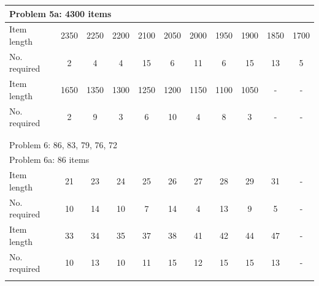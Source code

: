 \documentclass[a4paper]{article}
\begin{document}
\begin{table}[http]
\begin{tabular}{lcccccccccc}
        \multicolumn{11}{l}{Problem 5a: 4300 \quad 126 items} \\
        \midrule
        Item length & 2350 & 2250 & 2200 & 2100 & 2050 & 2000 & 1950 & 1900 & 1850 & 1700 \\
        No. required & 2 & 4 & 4 & 15 & 6 & 11 & 6 & 15 & 13 & 5 \\
        Item length & 1650 & 1350 & 1300 & 1250 & 1200 & 1150 & 1100 & 1050 & - & - \\
        No. required & 2 & 9 & 3 & 6 & 10 & 4 & 8 & 3 & - & - \\
        \bottomrule
        \\
        \hline
        \\
        \toprule
        \multicolumn{11}{l}{Problem 6: 86, 83, 79, 76, 72} \\
        \multicolumn{11}{l}{Problem 6a: 86 \quad 200 items} \\
        \midrule
        Item length & 21 & 23 & 24 & 25 & 26 & 27 & 28 & 29 & 31 & - \\ %
        No. required & 10 & 14 & 10 & 7 & 14 & 4 & 13 & 9 & 5 & - \\
        Item length & 33 & 34 & 35 & 37 & 38 & 41 & 42 & 44 & 47 & - \\
        No. required & 10 & 13 & 10 & 11 & 15 & 12 & 15 & 15 & 13 & - \\
        \toprule
        \\
        \hline        
        \bottomrule
    \end{tabular}        

\end{table}
\end{document}
